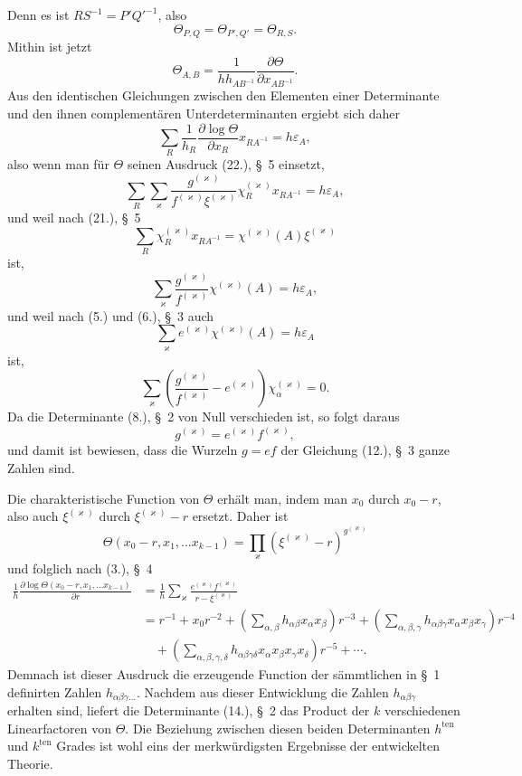 \documentclass[11pt]{article}
\begin{document}
Denn es ist $RS^{-1}=P'Q'^{-1}$, also
\[
\Theta_{P,Q}=\Theta_{P',Q'}=\Theta_{R,S}.
\]
Mithin ist jetzt
\begin{equation*}\tag{5.}
\Theta_{A,B}=\frac{1}{h h_{AB^{-1}}}\frac{\partial\Theta}{\partial x_{AB^{-1}}}.
\end{equation*}
Aus den identischen Gleichungen zwischen den Elementen einer Determinante und den ihnen complementären Unterdeterminanten ergiebt sich daher
\[
\sum_R \frac{1}{h_R}\frac{\partial\log\Theta}{\partial x_R}x_{RA^{-1}}=h\varepsilon_A,
\]
also wenn man für $\Theta$ seinen Ausdruck (22.), \S~5 einsetzt,
\[
\sum_R\sum_\varkappa \frac{g^{(\varkappa)}}{f^{(\varkappa)}\xi^{(\varkappa)}}\chi_R^{(\varkappa)}x_{RA^{-1}}=h\varepsilon_A,
\]
und weil nach (21.), \S~5
\[
\sum_R \chi_R^{(\varkappa)}x_{RA^{-1}}=\chi^{(\varkappa)}(A)\xi^{(\varkappa)}
\]
ist,
\[
\sum_\varkappa \frac{g^{(\varkappa)}}{f^{(\varkappa)}}\chi^{(\varkappa)}(A)=h\varepsilon_A,
\]
und weil nach (5.) und (6.), \S~3 auch
\begin{equation*}\tag{6.}
\sum_\varkappa e^{(\varkappa)}\chi^{(\varkappa)}(A)=h\varepsilon_A
\end{equation*}
ist,
\[
\sum_\varkappa\left(\frac{g^{(\varkappa)}}{f^{(\varkappa)}}-e^{(\varkappa)}\right)\chi_\alpha^{(\varkappa)}=0.
\]
Da die Determinante (8.), \S~2 von Null verschieden ist, so folgt daraus
\begin{equation*}\tag{7.}
g^{(\varkappa)}=e^{(\varkappa)}f^{(\varkappa)},
\end{equation*}
und damit ist bewiesen, dass die Wurzeln $g=ef$ der Gleichung (12.), \S~3 ganze Zahlen sind.

Die charakteristische Function von $\Theta$ erhält man, indem man $x_0$ durch $x_0-r$, also auch $\xi^{(\varkappa)}$ durch $\xi^{(\varkappa)}-r$ ersetzt. Daher ist
\[
\Theta(x_0-r,x_1,\ldots x_{k-1})=\prod_\varkappa (\xi^{(\varkappa)}-r)^{g^{(\varkappa)}}
\]
und folglich nach (3.), \S~4
\begin{equation*}\tag{8.}
\begin{aligned}
\frac{1}{h}\frac{\partial\log\Theta(x_0-r,x_1,\ldots x_{k-1})}{\partial r}
&=\frac{1}{h}\sum_\varkappa \frac{e^{(\varkappa)}f^{(\varkappa)}}{r-\xi^{(\varkappa)}} \\
&=r^{-1}+x_0r^{-2}+\left(\sum_{\alpha,\beta}h_{\alpha\beta}x_\alpha x_\beta\right)r^{-3}
+\left(\sum_{\alpha,\beta,\gamma}h_{\alpha\beta\gamma}x_\alpha x_\beta x_\gamma\right)r^{-4}\\
&\quad+\left(\sum_{\alpha,\beta,\gamma,\delta}h_{\alpha\beta\gamma\delta}x_\alpha x_\beta x_\gamma x_\delta\right)r^{-5}+\cdots .
\end{aligned}
\end{equation*}
Demnach ist dieser Ausdruck die erzeugende Function der sämmtlichen in \S~1 definirten Zahlen $h_{\alpha\beta\gamma\ldots}$. Nachdem aus dieser Entwicklung die Zahlen $h_{\alpha\beta\gamma}$ erhalten sind, liefert die Determinante (14.), \S~2 das Product der $k$ verschiedenen Linearfactoren von $\Theta$. Die Beziehung zwischen diesen beiden Determinanten $h^{\text{ten}}$ und $k^{\text{ten}}$ Grades ist wohl eins der merkwürdigsten Ergebnisse der entwickelten Theorie.
\end{document}
